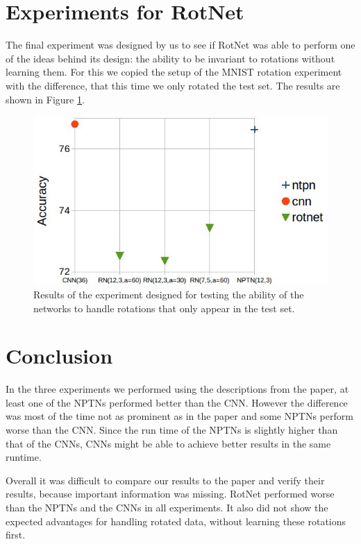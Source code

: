 \documentclass{llncs}
\begin{document}
\section{Experiments for RotNet}
The final experiment was designed by us to see if RotNet was able to perform one of the ideas behind its design: the ability to be invariant to rotations without learning them.
For this we copied the setup of the MNIST rotation experiment with the difference, that this time we only rotated the test set. The results are shown in Figure \ref{pic:experiment4}. 


\begin{figure}
	\begin{center}
	\includegraphics[scale=0.35]{result_images/experiment4.jpg}
	\caption{Results of the experiment designed for testing the ability of the networks to handle rotations that only appear in the test set.}
	\label{pic:experiment4}
	\end{center}
\end{figure}



\section{Conclusion}
In the three experiments we performed using the descriptions from the paper, at least one of the NPTNs performed better than the CNN.  However the difference was most of the time not as prominent as in the paper and some NPTNs perform worse than the CNN. 
Since the run time of the NPTNs is slightly higher than that of the CNNs, CNNs might be able to achieve better results in the same runtime.

Overall it was difficult to compare our results to the paper and verify their results, because important information was missing. 
RotNet performed worse than the NPTNs and the CNNs in all experiments.
It also did not show the expected advantages for handling rotated data, without learning these rotations first. 




\printbibliography
\end{document}
